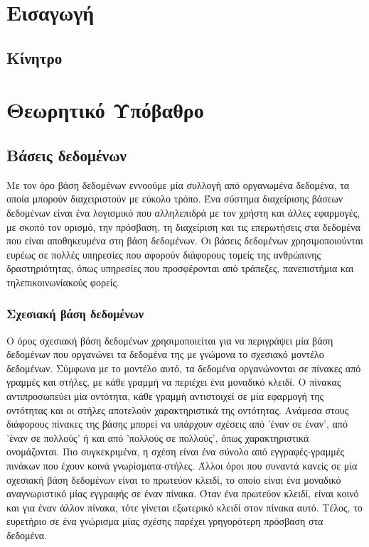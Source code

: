 \documentclass[diploma]{softlab-thesis}
\begin{document}

\tableofcontents


\mainmatter

\chapter{Εισαγωγή}

\section{Κίνητρο}


\chapter{Θεωρητικό Υπόβαθρο}

\section{Βάσεις δεδομένων}

Με τον όρο βάση δεδομένων εννοούμε μία συλλογή από οργανωμένα δεδομένα, τα οποία μπορούν διαχειριστούν με εύκολο τρόπο. Ένα σύστημα διαχείρισης βάσεων δεδομένων 
είναι ένα λογισμικό που αλληλεπιδρά με τον χρήστη και άλλες εφαρμογές, με σκοπό τον ορισμό, την πρόσβαση, τη διαχείριση και τις επερωτήσεις στα δεδομένα που είναι 
αποθηκευμένα στη βάση δεδομένων. Οι βάσεις δεδομένων χρησιμοποιούνται ευρέως σε πολλές υπηρεσίες που αφορούν διάφορους τομείς της ανθρώπινης δραστηριότητας, όπως 
υπηρεσίες που προσφέρονται από τράπεζες, πανεπιστήμια και τηλεπικοινωνίακούς φορείς.

\subsection{Σχεσιακή βάση δεδομένων}

Ο όρος σχεσιακή βάση δεδομένων χρησιμοποιείται για να περιγράψει μία βάση δεδομένων που οργανώνει τα δεδομένα της με γνώμονα το σχεσιακό μοντέλο δεδομένων. Σύμφωνα 
με το μοντέλο αυτό, τα δεδομένα οργανώνονται σε πίνακες από γραμμές και στήλες, με κάθε γραμμή να περιέχει ένα μοναδικό κλειδί. Ο πίνακας αντιπροσωπεύει μία οντότητα, 
κάθε γραμμή αντιστοιχεί σε μία εφαρμογή της οντότητας και οι στήλες αποτελούν χαρακτηριστικά της οντότητας. Ανάμεσα στους διάφορους πίνακες της βάσης μπορεί να υπάρχουν 
σχέσεις από 'έναν σε έναν', από 'έναν σε πολλούς' ή και από 'πολλούς σε πολλούς', όπως χαρακτηριστικά ονομάζονται. Πιο συγκεκριμένα, η σχέση είναι ένα σύνολο από 
εγγραφές-γραμμές πινάκων που έχουν κοινά γνωρίσματα-στήλες. Άλλοι όροι που συναντά κανείς σε μία σχεσιακή βάση δεδομένων είναι το πρωτεύον κλειδί, το οποίο είναι ένα 
μοναδικό αναγνωριστικό μίας εγγραφής σε έναν πίνακα. Όταν ένα πρωτεύον κλειδί, είναι κοινό και για έναν άλλον πίνακα, τότε γίνεται εξωτερικό κλειδί στον πίνακα αυτό. Τέλος, 
το ευρετήριο σε ένα γνώρισμα μίας σχέσης παρέχει γρηγορότερη πρόσβαση στα δεδομένα.
\end{document}
